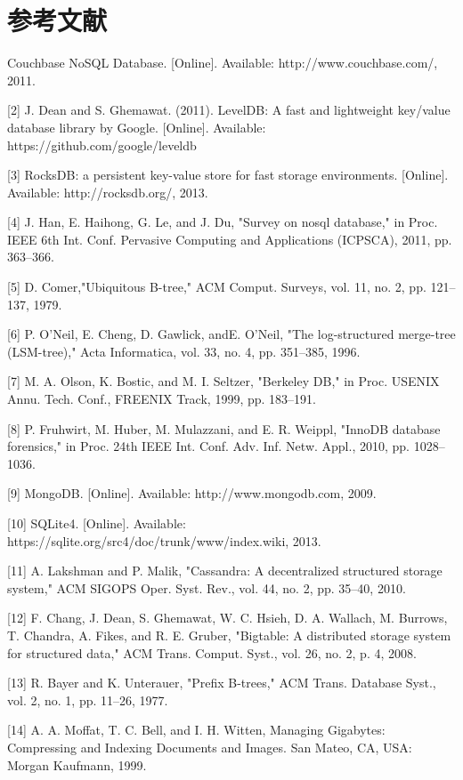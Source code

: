 \section{参考文献}
\begin{flushleft}
[1] Couchbase NoSQL Database. [Online]. Available: http://www.couchbase.com/, 2011.

[2] J. Dean and S. Ghemawat. (2011). LevelDB: A fast and lightweight key/value database library by Google. [Online]. Available: https://github.com/google/leveldb

[3] RocksDB: a persistent key-value store for fast storage environments. [Online]. Available: http://rocksdb.org/, 2013.

[4] J. Han, E. Haihong, G. Le, and J. Du, "Survey on nosql database," in Proc. IEEE 6th Int. Conf. Pervasive Computing and Applications (ICPSCA), 2011, pp. 363–366.

[5] D. Comer,"Ubiquitous B-tree," ACM Comput. Surveys, vol. 11, no. 2, pp. 121–137, 1979.

[6] P. O’Neil, E. Cheng, D. Gawlick, andE. O’Neil, "The log-structured merge-tree (LSM-tree)," Acta Informatica, vol. 33, no. 4, pp. 351–385, 1996.

[7] M. A. Olson, K. Bostic, and M. I. Seltzer, "Berkeley DB," in Proc. USENIX Annu. Tech. Conf., FREENIX Track, 1999, pp. 183–191.

[8] P. Fruhwirt, M. Huber, M. Mulazzani, and E. R. Weippl, "InnoDB database forensics," in Proc. 24th IEEE Int. Conf. Adv. Inf. Netw. Appl., 2010, pp. 1028–1036.

[9] MongoDB. [Online]. Available: http://www.mongodb.com, 2009.

[10] SQLite4. [Online]. Available: https://sqlite.org/src4/doc/trunk/www/index.wiki, 2013.

[11] A. Lakshman and P. Malik, "Cassandra: A decentralized structured storage system," ACM SIGOPS Oper. Syst. Rev., vol. 44, no. 2, pp. 35–40, 2010.

[12] F. Chang, J. Dean, S. Ghemawat, W. C. Hsieh, D. A. Wallach, M. Burrows, T. Chandra, A. Fikes, and R. E. Gruber, "Bigtable: A distributed storage system for structured data," ACM Trans. Comput. Syst., vol. 26, no. 2, p. 4, 2008.

[13] R. Bayer and K. Unterauer, "Prefix B-trees," ACM Trans. Database Syst., vol. 2, no. 1, pp. 11–26, 1977.

[14] A. A. Moffat, T. C. Bell, and I. H. Witten, Managing Gigabytes: Compressing and Indexing Documents and Images. San Mateo, CA, USA: Morgan Kaufmann, 1999.


\end{flushleft}
